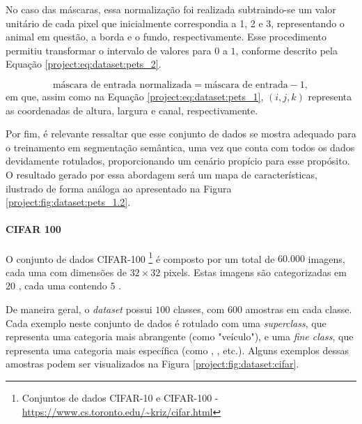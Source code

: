 No caso das máscaras, essa normalização foi realizada subtraindo-se um valor unitário de cada pixel que inicialmente correspondia a 1, 2 e 3, representando o animal em questão, a borda e o fundo, respectivamente. Esse procedimento permitiu transformar o intervalo de valores para $0$ a $1$, conforme descrito pela Equação \ref{project:eq:dataset:pets_2}.

\begin{equation}
    \label{project:eq:dataset:pets_2}
    \text{máscara de entrada normalizada} = \text{máscara de entrada} - 1,
\end{equation}
em que, assim como na Equação \ref{project:eq:dataset:pets_1}, $(i,j,k)$ representa as coordenadas de altura, largura e canal, respectivamente.

Por fim, é relevante ressaltar que esse conjunto de dados se mostra adequado para o treinamento em segmentação semântica, uma vez que conta com todos os dados devidamente rotulados, proporcionando um cenário propício para esse propósito. O resultado gerado por essa abordagem será um mapa de características, ilustrado de forma análoga ao apresentado na Figura \ref{project:fig:dataset:pets_1.2}.

\paragraph{CIFAR 100}
\label{project:dataset:cifar}
O conjunto de dados CIFAR-100 \footnote{Conjuntos de dados CIFAR-10 e CIFAR-100 - \url{https://www.cs.toronto.edu/~kriz/cifar.html}} \citep{Krizhevsky2014TheDataset} é composto por um total de $60.000$ imagens, cada uma com dimensões de $32 \times 32$ pixels. Estas imagens são categorizadas em $20$ , cada uma contendo $5$ .

De maneira geral, o \textit{dataset} possui $100$ classes, com $600$ amostras em cada classe. Cada exemplo neste conjunto de dados é rotulado com uma \textit{superclass}, que representa uma categoria mais abrangente (como "veículo"), e uma \textit{fine class}, que representa uma categoria mais específica (como , , etc.). Alguns exemplos dessas amostras podem ser visualizados na Figura \ref{project:fig:dataset:cifar}.

